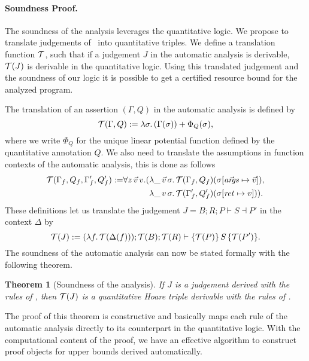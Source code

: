 \documentclass[nocopyrightspace,preprint]{sigplanconf}
\newcommand{\pref}[1]{\prettyref{#1}}
\newtheorem{theorem}{Theorem}
\begin{document}
\paragraph{Soundness Proof.}

The soundness of the analysis leverages the quantitative logic.
We propose to translate judgements of~\pref{fig:auto} into
quantitative triples.  We define a translation function
$\mathcal T$, such that if a judgement $J$ in the automatic analysis
is derivable, $\mathcal T(J)$ is derivable in the quantitative
logic.  Using this translated judgement and the soundness
of our logic it is possible to get a certified resource bound
for the analyzed program.

The translation of an assertion $(\Gamma, Q)$ in the automatic
analysis is defined by
$$
  \mathcal T(\Gamma, Q) := \lambda\sigma .\, (\Gamma(\sigma)) + \Phi_Q(\sigma),
$$
where we write $\Phi_Q$ for the unique linear potential function
defined by the quantitative annotation $Q$.  We also need to
translate the assumptions in function contexts of the automatic
analysis, this is done as follows
%
\begin{align*}
\mathcal T(\Gamma_f, Q_f, \Gamma'_f, Q'_f) :=
&\forall z \, \vec v \, v . (
  \lambda \_ \, \vec v \, \sigma .\, \mathcal T(\Gamma_f, Q_f)(\sigma[{\vec {\mathit{args}}} \mapsto \vec v]), \\
&\phantom{\forall z \, \vec v \, v . (}
  \lambda \_ \, v \, \sigma .\, \mathcal T(\Gamma'_f, Q'_f)(\sigma[{\mathit{ret}} \mapsto v])
  ).
\end{align*}
%
These definitions let us translate the judgement $J = B; R; P \vdash
S \dashv P'$ in the context $\Delta$ by
$$
  \mathcal T(J) :=
  (\lambda f .\, \mathcal T(\Delta(f))); \mathcal T(B); \mathcal T(R) \vdash
    \{\mathcal T(P)\}\, S\, \{\mathcal T(P')\}.
$$
The soundness of the automatic analysis can now be stated
formally with the following theorem.
%
\begin{theorem}[Soundness of the analysis]
  If $J$ is a judgement derived with the rules of
  \pref{fig:auto}, then $\mathcal T(J)$ is a quantitative
  Hoare triple derivable with the rules of
  \pref{fig:logic}.
\end{theorem}
%
\noindent
The proof of this theorem is constructive and basically
maps each rule of the automatic analysis directly to
its counterpart in the quantitative logic.  With the
computational content of the proof, we have an
effective algorithm to construct proof objects for
upper bounds derived automatically.
\end{document}
